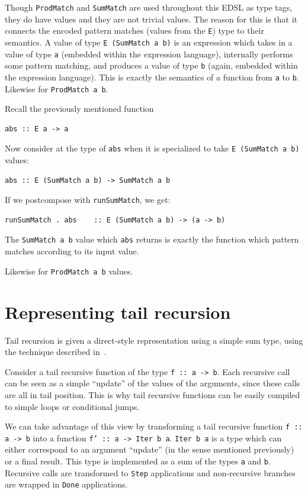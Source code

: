 \documentclass[runningheads, a4paper]{llncs}
\newcommand{\ttt}{\texttt}
\begin{document}
Though \ttt{ProdMatch} and \ttt{SumMatch} are used throughout this EDSL as type
tags, they do have values and they are not trivial values. The reason for this
is that it connects the encoded pattern matches (values from the \ttt{E}) type
to their semantics. A value of type \ttt{E (SumMatch a b)} is an expression
which takes in a value of type \ttt{a} (embedded within the expression
language), internally performs some pattern matching, and produces a value of
type \ttt{b} (again, embedded within the expression language). This is exactly
the semantics of a function from \ttt{a} to \ttt{b}. Likewise for \ttt{ProdMatch a b}.

Recall the previously mentioned function

\begin{lstlisting}
abs :: E a -> a
\end{lstlisting}

Now consider at the type of \ttt{abs} when it is specialized to take
\ttt{E (SumMatch a b)} values:

\begin{lstlisting}
abs :: E (SumMatch a b) -> SumMatch a b
\end{lstlisting}

If we postcompose with \ttt{runSumMatch}, we get:

\begin{lstlisting}
runSumMatch . abs    :: E (SumMatch a b) -> (a -> b)
\end{lstlisting}

The \ttt{SumMatch a b} value which \ttt{abs} returns is exactly the function
which pattern matches according to its input value.

Likewise for \ttt{ProdMatch a b} values.

\section{Representing tail recursion}
Tail recursion is given a direct-style representation using a simple sum type,
using the technique described in~\cite{Grebe:2017:RSD:3136040.3136048}.

Consider a tail recursive function of the type \ttt{f :: a -> b}. Each recursive
call can be seen as a simple ``update'' of the values of the arguments, since
these calls are all in tail position. This is why tail recursive functions
can be easily compiled to simple loops or conditional jumps.

We can take advantage of this view by transforming a tail recursive function
\ttt{f :: a -> b} into a function \ttt{f' :: a -> Iter b a}. \ttt{Iter b a} is a
type which can either correspond to an argument ``update'' (in the sense mentioned
previously) or a final result. This type is implemented as a sum of the types
\ttt{a} and \ttt{b}. Recursive calls are transformed to \ttt{Step} applications
and non-recursive branches are wrapped in \ttt{Done} applications.
\end{document}
